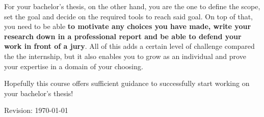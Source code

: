 For your bachelor's thesis, on the other hand, you are the one to define the scope, set the goal and decide on the required tools to reach said goal. On top of that, you need to be able \textbf{to motivate any choices you have made, write your research down in a professional report and be able to defend your work in front of a jury}. All of this adds a certain level of challenge compared the the internship, but it also enables you to grow as an individual and prove your expertise in a domain of your choosing.

Hopefully this course offers sufficient guidance to successfully start working on your bachelor's thesis!

\bigskip
Revision: \today